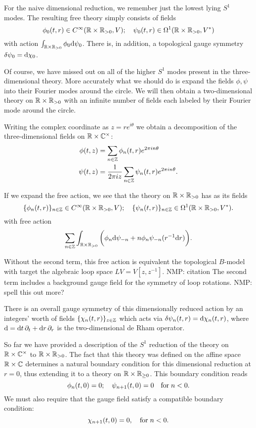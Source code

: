 \documentclass[11pt]{amsart}
\def\natalie#1{{\textcolor{green!65!black}{NMP: {#1}}}}
\begin{document}
For the naive dimensional reduction, we remember just the lowest lying $S^1$ modes. 
The resulting free theory simply consists of fields
\[
\phi_0(t,r) \in C^\infty(\mathbb R \times \mathbb R_{>0} , V) ; \quad \psi_0 (t,r) \in \Omega^1 (\mathbb R \times \mathbb R_{>0}, V^*) 
\] 
with action $\int_{\mathbb R\times \mathbb R_{>0}} \phi_0 {\rm d} \psi_0$.
There is, in addition, a topological gauge symmetry $\delta \psi_0 = {\rm d} \chi_0$. 

Of course, we have missed out on all of the higher $S^1$ modes present in the three-dimensional theory. 
More accurately what we should do is expand the fields $\phi, \psi$ into their Fourier modes around the circle.
We will then obtain a two-dimensional theory on $\mathbb R \times \mathbb R_{>0}$ with an infinite number of fields each labeled by their Fourier mode around the circle. 

Writing the complex coordinate as $z = r e^{i \theta}$ we obtain a decomposition of the three-dimensional fields on $\mathbb R \times \mathbb C^\times$:
\begin{align*}
\phi(t,z) & = \sum_{n \in \mathbb Z} \phi_n (t,r) e^{2 \pi i n \theta} \\
\psi(t,z) & = \frac{1}{2 \pi i z} \sum_{n \in \mathbb Z} \psi_n(t, r) e^{2 \pi i n \theta} .
\end{align*}

If we expand the free action, we see that the theory on $\mathbb R \times \mathbb R_{>0}$ has as its fields 
\[
\{\phi_n(t,r)\}_{n \in \mathbb Z} \in C^\infty(\mathbb R \times \mathbb R_{>0} , V) ; \quad \{\psi_n (t,r)\}_{n \in \mathbb Z} \in \Omega^1 (\mathbb R \times \mathbb R_{>0}, V^*) .
\] 
with free action
\[
\sum_{n \in \mathbb Z} \int_{\mathbb R \times \mathbb R_{>0}} \bigg(\phi_n {\rm d} \psi_{-n} + n \phi_n \psi_{-n} (r^{-1} {\rm d} r)  \bigg).
\]

Without the second term, this free action is equivalent the topological $B$-model with target the algebraic loop space $L V = V[z,z^{-1}]$.  \natalie{citation}
The second term includes a background gauge field for the symmetry of loop rotations. \natalie{spell this out more?}

There is an overall gauge symmetry of this dimensionally reduced action by an integers' worth of fields $\{\chi_n (t,r)\}_{z \in \mathbb Z}$ which acts via $\delta \psi_n (t,r) = {\rm d} \chi_n (t,r)$, where ${\rm d} = {\rm d} t \,\partial_t + {\rm d} r \,\partial_r$ is the two-dimensional de Rham operator. 

So far we have provided a description of the $S^1$ reduction of the theory on $\mathbb R \times \mathbb C^\times$ to $\mathbb R \times \mathbb R_{>0}$. 
The fact that this theory was defined on the affine space $\mathbb R \times \mathbb C$ determines a natural boundary condition for this dimensional reduction at $r = 0$, thus extending it to a theory on $\mathbb R \times \mathbb R_{\geq 0}$. 
This boundary condition reads
\begin{equation}\label{eqn:bc1}
\phi_n (t, 0) = 0 ; \quad \psi_{n+1} (t,0) = 0 \quad {\rm for} \; n < 0 .
\end{equation}
We must also require that the gauge field satisfy a compatible boundary condition:
\begin{equation}\label{eqn:gbc1}
\chi_{n+1} (t,0) = 0, \quad {\rm for} \; n < 0 .
\end{equation}
\end{document}
